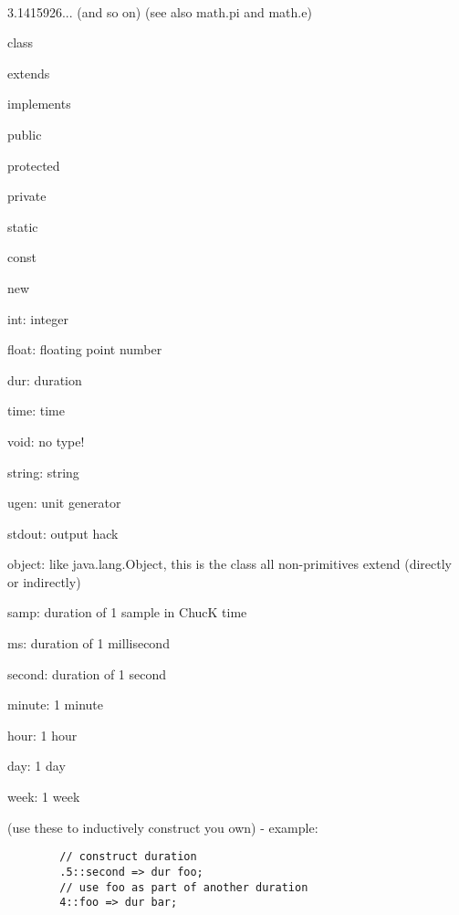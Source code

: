 \\
3.1415926... (and so on) (see also math.pi and math.e)

\begin{chuckitemize}
\item class
\item extends
\item implements
\item public
\item protected
\item private
\item static
\item const
\item new
\end{chuckitemize}

\begin{chuckitemize}
\item int: integer
\item float: floating point number
\item dur: duration
\item time: time
\item void: no type!
\item string: string
\item ugen: unit generator
\item stdout: output hack
\end{chuckitemize}



\begin{chuckitemize}
\item object: like java.lang.Object, this is the class all non-primitives extend (directly or indirectly)
\end{chuckitemize}

\begin{chuckitemize}
\item samp: duration of 1 sample in ChucK time
\item ms: duration of 1 millisecond
\item second: duration of 1 second
\item minute: 1 minute
\item hour: 1 hour
\item day: 1 day
\item week: 1 week
\item (use these to inductively construct you own) - example:
\end{chuckitemize}
\begin{verbatim}
        // construct duration
        .5::second => dur foo;
        // use foo as part of another duration
        4::foo => dur bar;
\end{verbatim}

